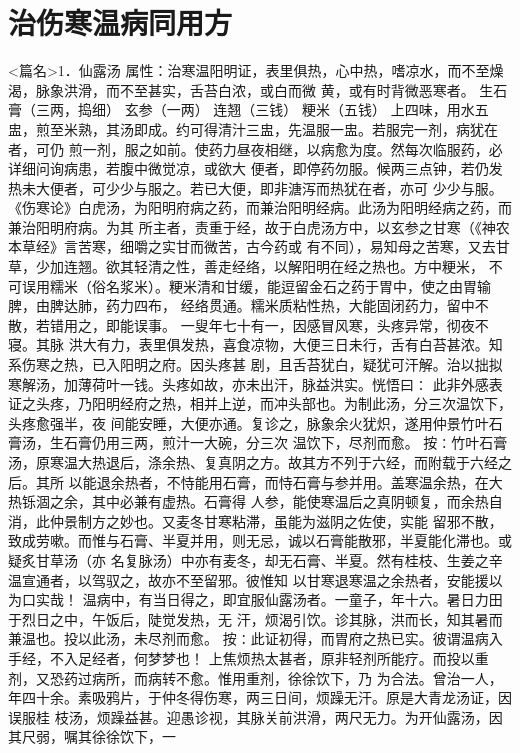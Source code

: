 \documentclass[a4paper,12pt,UTF8,twoside]{ctexbook}
\begin{document}
\chapter{治伤寒温病同用方}
<篇名>1．仙露汤
属性：治寒温阳明证，表里俱热，心中热，嗜凉水，而不至燥渴，脉象洪滑，而不至甚实，舌苔白浓，或白而微 
黄，或有时背微恶寒者。 
生石膏（三两，捣细） 玄参（一两） 连翘（三钱） 粳米（五钱） 
上四味，用水五盅，煎至米熟，其汤即成。约可得清汁三盅，先温服一盅。若服完一剂，病犹在者，可仍 
煎一剂，服之如前。使药力昼夜相继，以病愈为度。然每次临服药，必详细问询病患，若腹中微觉凉，或欲大 
便者，即停药勿服。候两三点钟，若仍发热未大便者，可少少与服之。若已大便，即非溏泻而热犹在者，亦可 
少少与服。 
《伤寒论》白虎汤，为阳明府病之药，而兼治阳明经病。此汤为阳明经病之药，而兼治阳明府病。为其 
所主者，责重于经，故于白虎汤方中，以玄参之甘寒（《神农本草经》言苦寒，细嚼之实甘而微苦，古今药或 
有不同），易知母之苦寒，又去甘草，少加连翘。欲其轻清之性，善走经络，以解阳明在经之热也。方中粳米， 
不可误用糯米（俗名浆米）。粳米清和甘缓，能逗留金石之药于胃中，使之由胃输脾，由脾达肺，药力四布， 
经络贯通。糯米质粘性热，大能固闭药力，留中不散，若错用之，即能误事。 
一叟年七十有一，因感冒风寒，头疼异常，彻夜不寝。其脉 
洪大有力，表里俱发热，喜食凉物，大便三日未行，舌有白苔甚浓。知系伤寒之热，已入阳明之府。因头疼甚 
剧，且舌苔犹白，疑犹可汗解。治以拙拟寒解汤，加薄荷叶一钱。头疼如故，亦未出汗，脉益洪实。恍悟曰∶ 
此非外感表证之头疼，乃阳明经府之热，相并上逆，而冲头部也。为制此汤，分三次温饮下，头疼愈强半，夜 
间能安睡，大便亦通。复诊之，脉象余火犹炽，遂用仲景竹叶石膏汤，生石膏仍用三两，煎汁一大碗，分三次 
温饮下，尽剂而愈。 
按∶竹叶石膏汤，原寒温大热退后，涤余热、复真阴之方。故其方不列于六经，而附载于六经之后。其所 
以能退余热者，不恃能用石膏，而恃石膏与参并用。盖寒温余热，在大热铄涸之余，其中必兼有虚热。石膏得 
人参，能使寒温后之真阴顿复，而余热自消，此仲景制方之妙也。又麦冬甘寒粘滞，虽能为滋阴之佐使，实能 
留邪不散，致成劳嗽。而惟与石膏、半夏并用，则无忌，诚以石膏能散邪，半夏能化滞也。或疑炙甘草汤（亦 
名复脉汤）中亦有麦冬，却无石膏、半夏。然有桂枝、生姜之辛温宣通者，以驾驭之，故亦不至留邪。彼惟知 
以甘寒退寒温之余热者，安能援以为口实哉！ 
温病中，有当日得之，即宜服仙露汤者。一童子，年十六。暑日力田于烈日之中，午饭后，陡觉发热，无 
汗，烦渴引饮。诊其脉，洪而长，知其暑而兼温也。投以此汤，未尽剂而愈。 
按∶此证初得，而胃府之热已实。彼谓温病入手经，不入足经者，何梦梦也！ 
上焦烦热太甚者，原非轻剂所能疗。而投以重剂，又恐药过病所，而病转不愈。惟用重剂，徐徐饮下，乃 
为合法。曾治一人，年四十余。素吸鸦片，于仲冬得伤寒，两三日间，烦躁无汗。原是大青龙汤证，因误服桂 
枝汤，烦躁益甚。迎愚诊视，其脉关前洪滑，两尺无力。为开仙露汤，因其尺弱，嘱其徐徐饮下，一 
\end{document}
